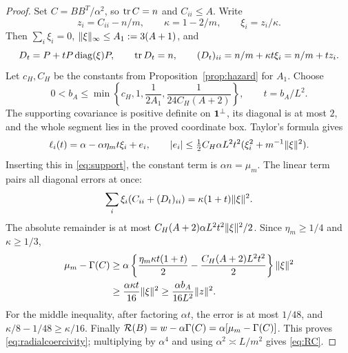\begin{proof}
Set $C=BB^T/\alpha^2$, so $\operatorname{tr} C=n$ and $C_{ii}\le A$. Write
\[
 z_i=C_{ii}-n/m,\qquad \kappa=1-2/m,\qquad \xi_i=z_i/\kappa.
\]
Then $\sum_i\xi_i=0$, $\lVert \xi\rVert_\infty\le A_1:=3(A+1)$, and
\begin{equation}\label{eq:diag-support}
 D_t=P+tP\operatorname{diag}(\xi)P,\qquad
 \operatorname{tr} D_t=n,\qquad (D_t)_{ii}=n/m+\kappa t\xi_i=n/m+t z_i.
\end{equation}
Let $c_H,C_H$ be the constants from Proposition~\ref{prop:hazard}
for $A_1$. Choose
\[
 0<b_A\le\min\left\{c_H,1,\frac1{2A_1},
                       \frac1{24C_H(A+2)}\right\},\qquad t=b_A/L^2.
\]
The supporting covariance is positive definite on $\mathbf 1^\perp$,
its diagonal is at most $2$, and the whole segment lies in the proved
coordinate box. Taylor's formula gives
\[
 \ell_i(t)=\alpha-\alpha\eta_m t\xi_i+e_i,\qquad
 \lvert e_i\rvert\le\tfrac12C_H\alpha L^2t^2
                  (\xi_i^2+m^{-1}\lVert \xi\rVert^2).
\]
Inserting this in \eqref{eq:support}, the constant term is
$\alpha n=\mu_m$. The linear term pairs all diagonal errors at once:
\[
 \sum_i\xi_i(C_{ii}+(D_t)_{ii})
                    =\kappa(1+t)\lVert \xi\rVert^2.
\]
The absolute remainder is at most
$C_H(A+2)\alpha L^2t^2\lVert \xi\rVert^2/2$. Since
$\eta_m\ge1/4$ and $\kappa\ge1/3$,
\begin{align*}
 \mu_m-\Gamma(C)
 &\ge\alpha\left\{\frac{\eta_m\kappa t(1+t)}2
                     -\frac{C_H(A+2)L^2t^2}2\right\}\lVert \xi\rVert^2\\
 &\ge\frac{\alpha\kappa t}{16}\lVert \xi\rVert^2
  \ge\frac{\alpha b_A}{16L^2}\lVert z\rVert^2.
\end{align*}
For the middle inequality, after factoring $\alpha t$, the error is
at most $1/48$, and $\kappa/8-1/48\ge\kappa/16$.
Finally
$\mathcal R(B)=w-\alpha\Gamma(C)=\alpha[\mu_m-\Gamma(C)]$.
This proves \eqref{eq:radialcoercivity}; multiplying by $\alpha^4$
and using $\alpha^2\asymp L/m^2$ gives \eqref{eq:RC}.
\end{proof}

